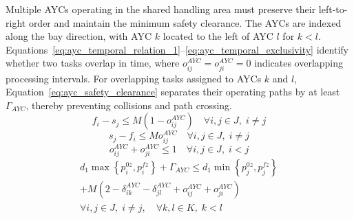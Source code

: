 Multiple AYCs operating in the shared handling area must preserve their left-to-right order and maintain the minimum safety clearance. The AYCs are indexed along the bay direction, with AYC $k$ located to the left of AYC $l$ for $k<l$. Equations~\ref{eq:ayc_temporal_relation_1}--\ref{eq:ayc_temporal_exclusivity} identify whether two tasks overlap in time, where $o_{ij}^{AYC}=o_{ji}^{AYC}=0$ indicates overlapping processing intervals. For overlapping tasks assigned to AYCs $k$ and $l$, Equation~\ref{eq:ayc_safety_clearance} separates their operating paths by at least $\Gamma_{AYC}$, thereby preventing collisions and path crossing.
\begin{equation}
\label{eq:ayc_temporal_relation_1}
f_i-s_j\leq M\left(1-o_{ij}^{AYC}\right)
\quad
\forall i,j\in J,\;i\neq j
\end{equation}
\begin{equation}
\label{eq:ayc_temporal_relation_2}
s_j-f_i\leq Mo_{ij}^{AYC}
\quad
\forall i,j\in J,\;i\neq j
\end{equation}
\begin{equation}
\label{eq:ayc_temporal_exclusivity}
o_{ij}^{AYC}+o_{ji}^{AYC}\leq1
\quad
\forall i,j\in J,\;i<j
\end{equation}
\begin{equation}
\label{eq:ayc_safety_clearance}
\begin{split}
d_1\max\left\{p_i^{0z},p_i^{fz}\right\}+\Gamma_{AYC}
\leq d_1\min\left\{p_j^{0z},p_j^{fz}\right\}\\+M\left(2-\delta_{ik}^{AYC}-\delta_{jl}^{AYC}+o_{ij}^{AYC}+o_{ji}^{AYC}\right)
\\
\forall i,j\in J,\;i\neq j,\quad
\forall k,l\in K,\;k<l
\end{split}
\end{equation}

